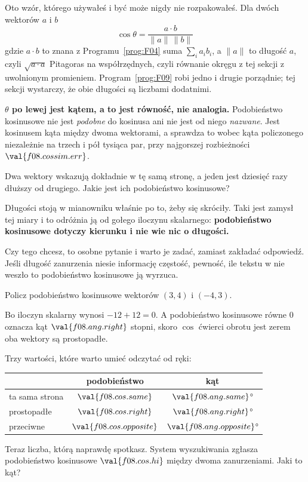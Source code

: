 \begin{fr}
Oto wzór, którego używałeś i być może nigdy nie rozpakowałeś. Dla dwóch
wektorów $a$ i $b$
\[ \cos\theta = \frac{a \cdot b}{\lVert a \rVert\, \lVert b \rVert} \]
gdzie $a \cdot b$ to znana z Programu~\ref{prog:F04} suma
$\sum_i a_i b_i$, a $\lVert a \rVert$ to długość $a$, czyli $\sqrt{a \cdot a}$
\dash{} Pitagoras na współrzędnych, czyli równanie okręgu z tej sekcji z
uwolnionym promieniem. Program~\ref{prog:F09} robi jedno i drugie porządnie;
tej sekcji wystarczy, że obie długości są liczbami dodatnimi.

\textbf{$\theta$ po lewej jest kątem, a to jest równość, nie analogia.}
Podobieństwo kosinusowe nie jest \emph{podobne} do kosinusa ani nie jest od
niego \emph{nazwane}. Jest kosinusem kąta między dwoma wektorami, a
 sprawdza to wobec kąta policzonego
niezależnie na trzech i pół tysiąca par, przy najgorszej rozbieżności
$\val{f08.cossim.err}$.

Dwa wektory wskazują dokładnie w tę samą stronę, a jeden jest dziesięć razy
dłuższy od drugiego. Jakie jest ich podobieństwo kosinusowe?
\nextframe
\end{fr}

\begin{fr}
Długości stoją w mianowniku właśnie po to, żeby się skróciły. Taki jest
zamysł tej miary i to odróżnia ją od gołego iloczynu skalarnego:
\textbf{podobieństwo kosinusowe dotyczy kierunku i nie wie nic o długości.}

Czy tego chcesz, to osobne pytanie i warto je zadać, zamiast zakładać
odpowiedź. Jeśli długość zanurzenia niesie informację \dash{} częstość,
pewność, ile tekstu w nie weszło \dash{} to podobieństwo kosinusowe ją
wyrzuca.

Policz podobieństwo kosinusowe wektorów $(3, 4)$ i $(-4, 3)$.
\nextframe
\end{fr}

\begin{fr}
Bo iloczyn skalarny wynosi $-12 + 12 = 0$. A podobieństwo kosinusowe równe
$0$ oznacza kąt $\val{f08.ang.right}$ stopni, skoro $\cos$ ćwierci obrotu jest
zerem \dash{} oba wektory są prostopadłe.

Trzy wartości, które warto umieć odczytać od ręki:

\begin{center}
\begin{tabular}{lcc}
\toprule
& podobieństwo & kąt \\
\midrule
ta sama strona & $\val{f08.cos.same}$ & $\val{f08.ang.same}$° \\
prostopadłe & $\val{f08.cos.right}$ & $\val{f08.ang.right}$° \\
przeciwne & $\val{f08.cos.opposite}$ & $\val{f08.ang.opposite}$° \\
\bottomrule
\end{tabular}
\end{center}

Teraz liczba, którą naprawdę spotkasz. System wyszukiwania zgłasza
podobieństwo kosinusowe $\val{f08.cos.hi}$ między dwoma zanurzeniami. Jaki
to kąt?
\nextframe
\end{fr}

